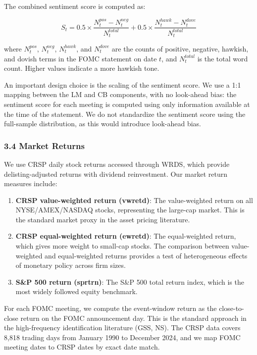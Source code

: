\documentclass[12pt]{article}
\begin{document}
The combined sentiment score is computed as:

\[S_t = 0.5 \times \frac{N^{pos}_t - N^{neg}_t}{N^{total}_t} + 0.5 \times \frac{N^{hawk}_t - N^{dove}_t}{N^{total}_t}\]

where \(N^{pos}_t\), \(N^{neg}_t\), \(N^{hawk}_t\), and \(N^{dove}_t\)
are the counts of positive, negative, hawkish, and dovish terms in the
FOMC statement on date \(t\), and \(N^{total}_t\) is the total word
count. Higher values indicate a more hawkish tone.

An important design choice is the scaling of the sentiment score. We use
a 1:1 mapping between the LM and CB components, with no look-ahead bias:
the sentiment score for each meeting is computed using only information
available at the time of the statement. We do not standardize the
sentiment score using the full-sample distribution, as this would
introduce look-ahead bias.

\subsubsection{3.4 Market Returns}\label{market-returns}

We use CRSP daily stock returns accessed through WRDS, which provide
delisting-adjusted returns with dividend reinvestment. Our market return
measures include:

\begin{enumerate}
\def\labelenumi{\arabic{enumi}.}
\item
  \textbf{CRSP value-weighted return (vwretd)}: The value-weighted
  return on all NYSE/AMEX/NASDAQ stocks, representing the large-cap
  market. This is the standard market proxy in the asset pricing
  literature.
\item
  \textbf{CRSP equal-weighted return (ewretd)}: The equal-weighted
  return, which gives more weight to small-cap stocks. The comparison
  between value-weighted and equal-weighted returns provides a test of
  heterogeneous effects of monetary policy across firm sizes.
\item
  \textbf{S\&P 500 return (sprtrn)}: The S\&P 500 total return index,
  which is the most widely followed equity benchmark.
\end{enumerate}

For each FOMC meeting, we compute the event-window return as the
close-to-close return on the FOMC announcement day. This is the standard
approach in the high-frequency identification literature (GSS, NS). The
CRSP data covers 8,818 trading days from January 1990 to December 2024,
and we map FOMC meeting dates to CRSP dates by exact date match.
\end{document}
